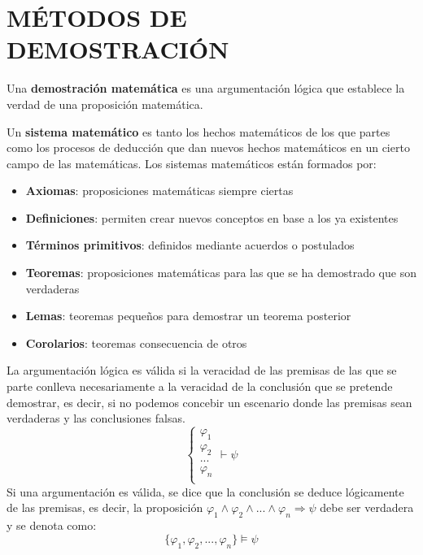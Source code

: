 \documentclass[10pt,a4paper,openright]{book}
\begin{document}
\section*{MÉTODOS DE DEMOSTRACIÓN}
Una \textbf{demostración matemática} es una argumentación lógica que establece la verdad de una proposición matemática.\par
Un \textbf{sistema matemático} es tanto los hechos matemáticos de los que partes como los procesos de deducción que dan nuevos hechos matemáticos en un cierto campo de las matemáticas. Los sistemas matemáticos están formados por:
\vspace{0.5cm}
\begin{itemize}
\item \textbf{Axiomas}: proposiciones matemáticas siempre ciertas
\item \textbf{Definiciones}: permiten crear nuevos conceptos en base a los ya existentes
\item \textbf{Términos primitivos}: definidos mediante acuerdos o postulados
\item \textbf{Teoremas}: proposiciones matemáticas para las que se ha demostrado que son verdaderas
\item \textbf{Lemas}: teoremas pequeños para demostrar un teorema posterior
\item \textbf{Corolarios}: teoremas consecuencia de otros
\end{itemize}
La argumentación lógica es válida si la veracidad de las premisas de las que se parte conlleva necesariamente a la veracidad de la conclusión que se pretende demostrar, es decir, si no podemos concebir un escenario donde las premisas sean verdaderas y las conclusiones falsas.
\begin{equation*}
\begin{cases}
	\varphi_1 \\
	\varphi_2 \\
	... \\
	\varphi_n \\
\end{cases}
\vdash
\psi
\end{equation*}
Si una argumentación es válida, se dice que la conclusión se deduce lógicamente de las premisas, es decir, la proposición $\varphi_1 \wedge \varphi_2 \wedge ... \wedge \varphi_n \Rightarrow \psi$ debe ser verdadera y se denota como:
$$\{\varphi_1,\varphi_2, ...,\varphi_n\}\models \psi$$
\end{document}
